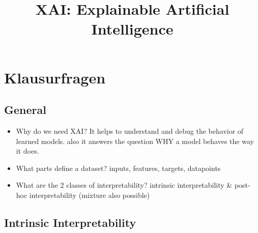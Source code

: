 \documentclass{report}
\title{XAI: Explainable Artificial Intelligence}
\begin{document}
	
	\maketitle
	\newpage
	
	\tableofcontents
	\newpage
	
	\chapter{Klausurfragen}
	
	\section{General}
	
	\begin{itemize}
		\item Why do we need XAI?
		\newline It helps to understand and debug the behavior of learned models. also it answers the question WHY a model behaves the way it does.
		\item What parts define a dataset?
		\newline inputs, features, targets, datapoints
		\item What are the 2 classes of interpretability?
		\newline intrinsic interpretability \& post-hoc interpretability (mixture also possible)
	\end{itemize}

	\section{Intrinsic Interpretability}
	
\end{document}
